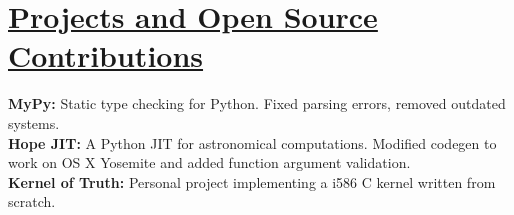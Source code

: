 \documentclass[11pt]{article}
\newcommand{\heading}[1]{
    \section*{\uline{\hfill #1}}
}
\newcommand{\project}[2]{
    \textbf{#1} \hfill #2 \\
}
\begin{document}
\heading{Projects and Open Source Contributions}
\project{MyPy:}{Static type checking for Python. Fixed parsing errors,
	removed outdated systems.}
\project{Hope JIT:}{A Python JIT for astronomical computations. Modified codegen
to work on OS X Yosemite and added function argument validation.}
\project{Kernel of Truth:}{Personal project implementing a i586 C kernel written
	from scratch.}
\end{document}
